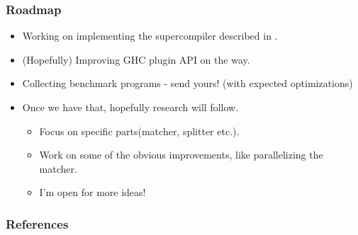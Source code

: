 \documentclass{beamer}
\begin{document}
\begin{frame}
    \frametitle{Roadmap}

    \begin{itemize}[<+->]
        \item
            Working on implementing the supercompiler described in
            \citet{callbyneed-sc}.
        \item
            (Hopefully) Improving GHC plugin API on the way.
        \item
            Collecting benchmark programs - send yours! (with expected
            optimizations)
        \item
            Once we have that, hopefully research will follow.
            \begin{itemize}[<+->]
                \item
                    Focus on specific parts(matcher, splitter etc.).
                \item
                    Work on some of the obvious improvements, like parallelizing
                    the matcher.
                \item
                    I'm open for more ideas!
            \end{itemize}
    \end{itemize}
\end{frame}

\begin{frame}[allowframebreaks]
    \frametitle{References}

    
    
\end{frame}
\end{document}
